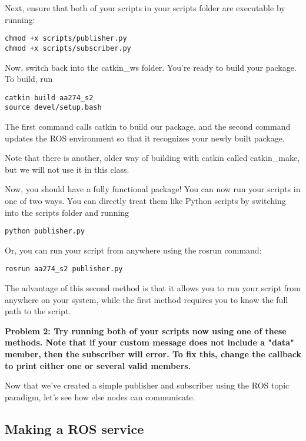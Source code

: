Next, ensure that both of your scripts in your scripts folder are executable by running:

\begin{lstlisting}
chmod +x scripts/publisher.py
chmod +x scripts/subscriber.py
\end{lstlisting}

Now, switch back into the catkin\_ws folder. You're ready to build your package. To build, run

\begin{lstlisting}
catkin build aa274_s2
source devel/setup.bash
\end{lstlisting}

The first command calls catkin to build our package, and the second command updates the ROS environment so that it recognizes your newly built package.

Note that there is another, older way of building with catkin called catkin\_make, but we will not use it in this class.

Now, you should have a fully functional package! You can now run your scripts in one of two ways. You can directly treat them like Python scripts by switching into the scripts folder and running 

\begin{lstlisting}
python publisher.py
\end{lstlisting}

Or, you can run your script from anywhere using the rosrun command:

\begin{lstlisting}
rosrun aa274_s2 publisher.py
\end{lstlisting}
The advantage of this second method is that it allows you to run your script from anywhere on your system, while the first method requires you to know the full path to the script.

\textbf{Problem 2: Try running both of your scripts now using one of these methods. Note that if your custom message does not include a "data" member, then the subscriber will error. To fix this, change the callback to print either one or several valid members.}

Now that we've created a simple publisher and subscriber using the ROS topic paradigm, let's see how else nodes can communicate. 
\subsection{Making a ROS service}

